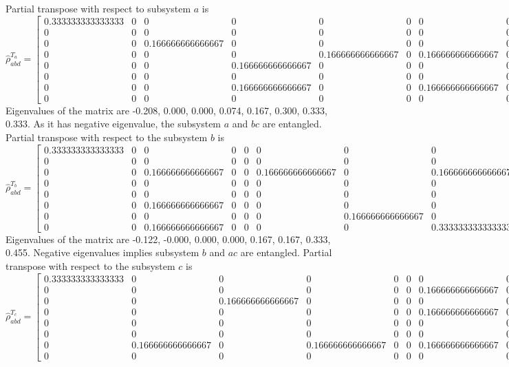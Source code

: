 \documentclass{amsart}
\theoremstyle{plain}
\theoremstyle{definition}
\theoremstyle{plain}
\begin{document}
Partial transpose with respect to subsystem $a$ is
\begin{equation*}
	\hat{\rho}_{abd}^{T_a} = \left[\begin{matrix}0.333333333333333 & 0 & 0 & 0 & 0 & 0 & 0 & 0\\0 & 0 & 0 & 0 & 0 & 0 & 0 & 0\\0 & 0 & 0.166666666666667 & 0 & 0 & 0 & 0 & 0\\0 & 0 & 0 & 0 & 0.166666666666667 & 0 & 0.166666666666667 & 0\\0 & 0 & 0 & 0.166666666666667 & 0 & 0 & 0 & 0\\0 & 0 & 0 & 0 & 0 & 0 & 0 & 0\\0 & 0 & 0 & 0.166666666666667 & 0 & 0 & 0.166666666666667 & 0\\0 & 0 & 0 & 0 & 0 & 0 & 0 & 0.333333333333333\end{matrix}\right]
	.
\end{equation*}
Eigenvalues of the matrix are -0.208, 0.000, 0.000, 0.074, 0.167, 0.300, 0.333, 0.333. As it has negative eigenvalue, the subsystem $a$ and $bc$ are entangled.
Partial transpose with respect to the subsystem $b$ is
\begin{equation*}
	\hat{\rho}_{abd}^{T_b} = \left[\begin{matrix}0.333333333333333 & 0 & 0 & 0 & 0 & 0 & 0 & 0\\0 & 0 & 0 & 0 & 0 & 0 & 0 & 0\\0 & 0 & 0.166666666666667 & 0 & 0 & 0.166666666666667 & 0 & 0.166666666666667\\0 & 0 & 0 & 0 & 0 & 0 & 0 & 0\\0 & 0 & 0 & 0 & 0 & 0 & 0 & 0\\0 & 0 & 0.166666666666667 & 0 & 0 & 0 & 0 & 0\\0 & 0 & 0 & 0 & 0 & 0 & 0.166666666666667 & 0\\0 & 0 & 0.166666666666667 & 0 & 0 & 0 & 0 & 0.333333333333333\end{matrix}\right]
	.
\end{equation*}
Eigenvalues of the matrix are -0.122, -0.000, 0.000, 0.000, 0.167, 0.167, 0.333, 0.455. Negative eigenvalues implies subsystem $b$ and $ac$ are entangled.
Partial transpose with respect to the subsystem $c$ is
\begin{equation*}
	\hat{\rho}_{abd}^{T_c} = \left[\begin{matrix}0.333333333333333 & 0 & 0 & 0 & 0 & 0 & 0 & 0\\0 & 0 & 0 & 0 & 0 & 0 & 0.166666666666667 & 0\\0 & 0 & 0.166666666666667 & 0 & 0 & 0 & 0 & 0\\0 & 0 & 0 & 0 & 0 & 0 & 0.166666666666667 & 0\\0 & 0 & 0 & 0 & 0 & 0 & 0 & 0\\0 & 0 & 0 & 0 & 0 & 0 & 0 & 0\\0 & 0.166666666666667 & 0 & 0.166666666666667 & 0 & 0 & 0.166666666666667 & 0\\0 & 0 & 0 & 0 & 0 & 0 & 0 & 0.333333333333333\end{matrix}\right].
\end{equation*}
\end{document}
